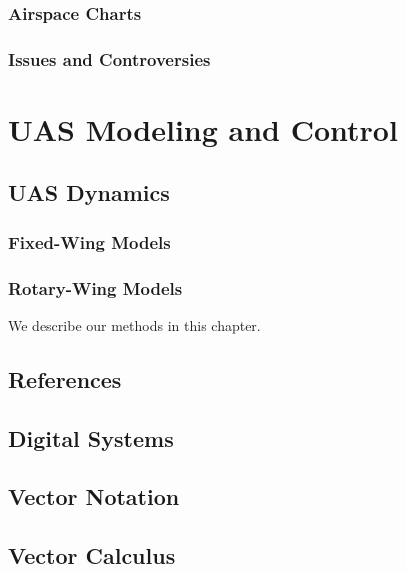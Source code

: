 \documentclass[
]{book}
\begin{document}
\hypertarget{airspace-charts}{%
\section{Airspace Charts}\label{airspace-charts}}

\hypertarget{issues-and-controversies}{%
\section{Issues and Controversies}\label{issues-and-controversies}}

\hypertarget{part-uas-modeling-and-control}{%
\part{UAS Modeling and Control}\label{part-uas-modeling-and-control}}

\hypertarget{uas-dynamics}{%
\chapter{UAS Dynamics}\label{uas-dynamics}}

\hypertarget{fixed-wing-models}{%
\section{Fixed-Wing Models}\label{fixed-wing-models}}

\hypertarget{rotary-wing-models}{%
\section{Rotary-Wing Models}\label{rotary-wing-models}}

We describe our methods in this chapter.

\hypertarget{references}{%
\chapter*{References}\label{references}}

\hypertarget{appendix-appendix}{%
\appendix}


\hypertarget{digital-systems}{%
\chapter{Digital Systems}\label{digital-systems}}

\hypertarget{vector-notation}{%
\chapter{Vector Notation}\label{vector-notation}}

\hypertarget{vector-calculus}{%
\chapter{Vector Calculus}\label{vector-calculus}}

  
\end{document}
